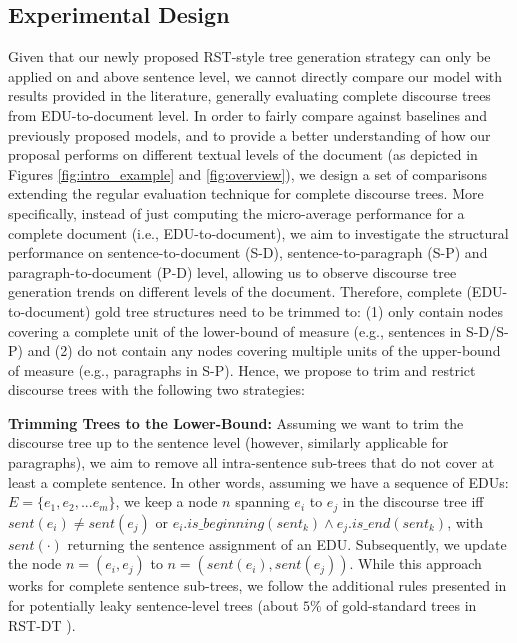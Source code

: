 \documentclass[letterpaper]{article} %
\begin{document}
\subsection{Experimental Design}
Given that our newly proposed RST-style tree generation strategy can only be applied on and above sentence level, we cannot directly compare our model with results provided in the literature, generally evaluating complete discourse trees from EDU-to-document level. 
In order to fairly compare against baselines and previously proposed models, and to provide a better understanding of how our proposal performs on different textual levels of the document (as depicted in Figures \ref{fig:intro_example} and \ref{fig:overview}), we design a set of comparisons extending the regular evaluation technique for complete discourse trees. 
More specifically, instead of just computing the micro-average performance for a complete document (i.e., EDU-to-document), we aim to investigate the structural performance on sentence-to-document (S-D), sentence-to-paragraph (S-P) and paragraph-to-document (P-D) level, allowing us to observe discourse tree generation trends on different levels of the document.
Therefore, complete (EDU-to-document) gold tree structures need to be trimmed to: (1) only contain nodes covering a complete unit of the lower-bound of measure (e.g., sentences in S-D/S-P) and (2) do not contain any nodes covering multiple units of the upper-bound of measure (e.g., paragraphs in S-P). Hence, we propose to trim and restrict discourse trees with the following two strategies: 

\noindent
\textbf{Trimming Trees to the Lower-Bound:}
Assuming we want to trim the discourse tree up to the sentence level (however, similarly applicable for paragraphs), we aim to remove all intra-sentence sub-trees that do not cover at least a complete sentence. In other words, assuming we have a sequence of EDUs: $E = \{e_1, e_2, ...e_m\}$, we keep a node $n$ spanning $e_i$ to $e_j$ in the discourse tree iff $sent(e_i) \neq sent(e_j)$ or $e_i.is\_beginning(sent_k) \land e_j.is\_end(sent_k)$, with $sent(\cdot)$ returning the sentence assignment of an EDU. Subsequently, we update the node $n = (e_i, e_j)$ to $n = (sent(e_i), sent(e_j))$. While this approach works for complete sentence
sub-trees, we follow the additional rules presented in \citet{sporleder-lascarides-2004-combining} for potentially leaky sentence-level trees (about $5\%$ of gold-standard trees in RST-DT \cite{joty-etal-2015-codra}). 
\end{document}
